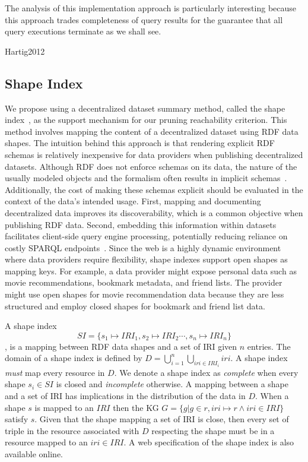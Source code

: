 The analysis
of this implementation approach is particularly interesting because
this approach trades completeness of query results for the guarantee
that all query executions terminate as we shall see.


Hartig2012
\fi


\subsection{Shape Index}

We propose using a decentralized dataset summary method, called the shape index~\cite{tam2024opportunitiesshapebasedoptimizationlink}, as the support mechanism for our pruning reachability criterion.
This method involves mapping the content of a decentralized dataset using RDF data shapes.
The intuition behind this approach is that rendering explicit RDF schemas is relatively inexpensive for data providers when publishing decentralized datasets.
Although RDF does not enforce schemas on its data, the nature of the usually modeled objects and the formalism often results in implicit schemas~\cite{Neumann2011CharacteristicSA}.
Additionally, the cost of making these schemas explicit should be evaluated in the context of the data's intended usage.
First, mapping and documenting decentralized data improves its discoverability, which is a common objective when publishing RDF data.
Second, embedding this information within datasets facilitates client-side query engine processing, potentially reducing reliance on costly SPARQL endpoints~\cite{aranda2013}.
Since the web is a highly dynamic environment where data providers require flexibility, shape indexes support open shapes as mapping keys.
For example, a data provider might expose personal data such as movie recommendations, bookmark metadata, and friend lists.
The provider might use open shapes for movie recommendation data because they are less structured and employ closed shapes for bookmark and friend list data.

A shape index 
\begin{equation}\label{eq:shapeIndex}
   SI = \{s_1 \mapsto IRI_1, s_2 \mapsto IRI_2 \cdots, s_n \mapsto IRI_n\}
\end{equation}
, is a mapping between RDF data shapes and a set of IRI given $n$ entries.
The domain of a shape index is defined by $D = \bigcup_{i=1}^{n} \bigcup_{iri \in IRI_i} iri$.
A shape index \emph{must} map every resource in $D$.
We denote a shape index as \emph{complete} when every shape $s_i \in SI$ is closed and \emph{incomplete} otherwise.
A mapping between a shape and a set of IRI has implications in the distribution of the data in $D$.
When a shape $s$ is mapped to an $IRI$ then the KG $G = \{g | g \in r, iri \mapsto r \land iri \in IRI\}$ satisfy $s$.
Given that the shape mapping a set of IRI is close, then every set of triple in the resource associated with $D$ respecting the shape must be in a resource mapped to an $iri \in IRI$.
A web specification of the shape index is also available online.~

